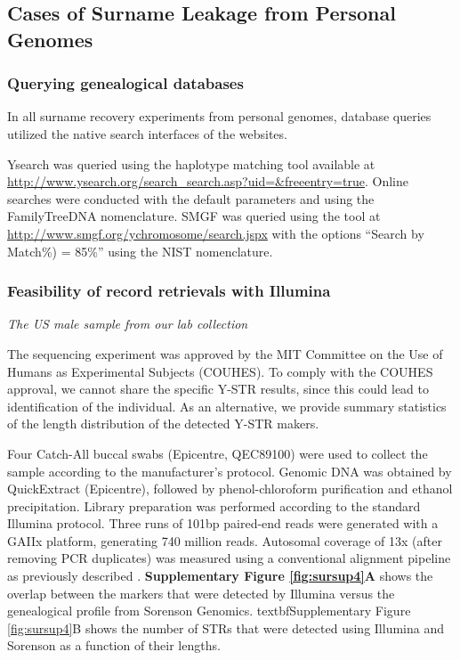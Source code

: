 \subsection{Cases of Surname Leakage from Personal Genomes}
\subsubsection{Querying genealogical databases}
In all surname recovery experiments from personal genomes, database queries utilized the native search interfaces of the websites. 

Ysearch was queried using the haplotype matching tool available at \url{http://www.ysearch.org/search_search.asp?uid=&freeentry=true}. Online searches were conducted with the default parameters and using the FamilyTreeDNA nomenclature. SMGF was queried using the tool at \url{http://www.smgf.org/ychromosome/search.jspx} with the options ``Search by Match\%) = 85\%'' using the NIST nomenclature.

\subsubsection{Feasibility of record retrievals with Illumina}
\emph{The US male sample from our lab collection}

The sequencing experiment was approved by the MIT Committee on the Use of Humans as Experimental Subjects (COUHES).  To comply with the COUHES approval, we cannot share the specific Y-STR results, since this could lead to identification of the individual. As an alternative, we provide summary statistics of the length distribution of the detected Y-STR makers. 

Four Catch-All buccal swabs (Epicentre, QEC89100) were used to collect the sample according to the manufacturer's protocol. Genomic DNA was obtained by QuickExtract (Epicentre), followed by phenol-chloroform purification and ethanol precipitation. Library preparation was performed according to the standard Illumina protocol. Three runs of 101bp paired-end reads were generated with a GAIIx platform, generating 740 million reads. Autosomal coverage of 13x (after removing PCR duplicates) was measured using a conventional alignment pipeline as previously described \cite{ErlichEdvardsonHodgesEtAl2011}.  \textbf{Supplementary Figure \ref{fig:sursup4}A} shows the overlap between the markers that were detected by Illumina versus the genealogical profile from Sorenson Genomics. textbf{Supplementary Figure \ref{fig:sursup4}B} shows the number of STRs that were detected using Illumina and Sorenson as a function of their lengths. 


